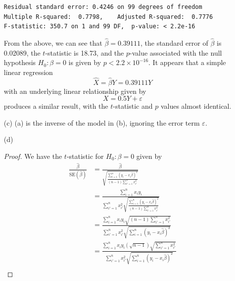 \begin{itemize}
\begin{lstlisting}
Residual standard error: 0.4246 on 99 degrees of freedom
Multiple R-squared:  0.7798,    Adjusted R-squared:  0.7776
F-statistic: 350.7 on 1 and 99 DF,  p-value: < 2.2e-16
        \end{lstlisting}
        From the above, we can see that $\hat{\beta} = 0.39111$, the standard error
        of $\hat{\beta}$ is 0.02089, the $t$-statistic is 18.73, and the $p$-value
        associated with the null hypothesis $H_0 : \beta = 0$ is given by
        $p < 2.2 \times 10^{-16}$. It appears that a simple linear regression
        \[
            \hat{X} = \hat{\beta} Y = 0.39111Y
        \]
        with an underlying linear relationship given by
        \[
            X = 0.5Y + \varepsilon
        \]
        produces a similar result, with the $t$-statistic and $p$ values almost
        identical.
    \item[(c)] (a) is the inverse of the model in (b), ignoring the error term
        $\varepsilon$.
    \item[(d)]
        \begin{proof}
            We have the $t$-statistic for $H_0 : \beta = 0$ given by
            \begin{equation*}
                \begin{split}
                    \frac{\hat{\beta}}{\text{SE}(\hat{\beta})}
                    &= \frac{\hat{\beta}}{\sqrt{
                            \frac{\sum_{i=1}^n {(y_i - x_i\hat{\beta})}^2}
                            {(n - 1)\sum_{i'=1}^n x_{i'}^2}
                    }} \\
                    &= \frac{\sum_{i=1}^n x_i y_i}{
                        \sum_{i'=1}^n x_{i'}^2
                        \sqrt{\frac{\sum_{i=1}^n {(y_i - x_i\hat{\beta})}^2}
                            {(n - 1)\sum_{i'=1}^n x_{i'}^2}
                    }} \\
                    &= \frac{
                        \sum_{i=1}^n x_i y_i
                        \sqrt{(n - 1)\sum_{i'=1}^n x_{i'}^2}
                    }{
                        \sum_{i'=1}^n x_{i'}^2
                        \sqrt{\sum_{i=1}^n {(y_i - x_i\hat{\beta})}^2}
                    } \\
                    &= \frac{
                        \sum_{i=1}^n x_i y_i
                        (\sqrt{n - 1})\sqrt{\sum_{i'=1}^n x_{i'}^2}
                    }{
                        \sum_{i'=1}^n x_{i'}^2
                        \sqrt{\sum_{i=1}^n {(y_i - x_i\hat{\beta})}^2}
                    } \\

\end{split}
\end{equation*}
\end{proof}
\end{itemize}
